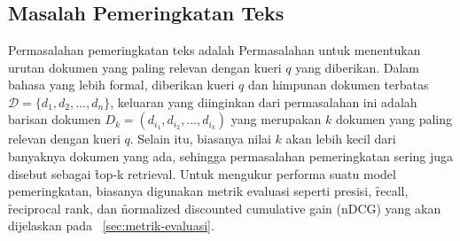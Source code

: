 \chapter{\babDua}
\label{bab:2}


\section{Masalah Pemeringkatan Teks}
    Permasalahan pemeringkatan teks adalah Permasalahan untuk menentukan urutan dokumen yang paling relevan dengan kueri $q$ yang diberikan. Dalam bahasa yang lebih formal, diberikan kueri $q$ dan himpunan dokumen terbatas $\mathcal{D}= \{d_1, d_2, ..., d_n\}$, keluaran yang diinginkan dari permasalahan ini adalah barisan dokumen $D_k = (d_{i_1}, d_{i_2}, ..., d_{i_k})$ yang merupakan $k$ dokumen yang paling relevan dengan kueri $q$. Selain itu, biasanya nilai $k$ akan lebih kecil dari banyaknya dokumen yang ada, sehingga permasalahan pemeringkatan sering juga disebut sebagai \f{top-k retrieval}. Untuk mengukur performa suatu model pemeringkatan, biasanya digunakan metrik evaluasi seperti presisi, \f{recall}, \f{reciprocal rank}, dan \f{normalized discounted cumulative gain} (nDCG) yang akan dijelaskan pada \sect~\ref{sec:metrik-evaluasi}.


